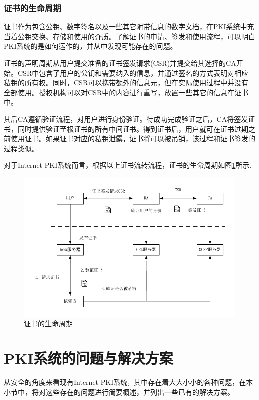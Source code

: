 \subsubsection{证书的生命周期}


证书作为包含公钥、数字签名以及一些其它附带信息的数字文档，在PKI系统中充当着公钥交换、存储和使用的介质。了解证书的申请、签发和使用流程，可以明白PKI系统的是如何运作的，并从中发现可能存在的问题。

证书的声明周期从用户提交准备的证书签发请求(CSR)并提交给其选择的CA开始。CSR中包含了用户的公钥和需要纳入的信息，并通过签名的方式表明对相应私钥的所有权。同时，CSR可以携带额外的信息元，但在实际使用过程中并没有全部使用。授权机构可以对CSR中的内容进行重写，放置一些其它的信息在证书中。

其后CA遵循验证流程，对用户进行身份验证。待成功完成验证之后，CA将签发证书，同时提供验证至根证书的所有中间证书。得到证书后，用户就可在证书过期之前使用证书。如果证书对应的私钥泄露，证书将可以被吊销，该过程和证书签发的过程类似。

对于Internet PKI系统而言，根据以上证书流转流程，证书的生命周期如图\ref{fig:cert_lifecycle}所示.

\begin{figure}[htbp]
 	\centering
 	\includegraphics[width = 1\textwidth]{img/cert_lifecycle}
 	\caption{证书的生命周期}\label{fig:cert_lifecycle}
\end{figure}

\section{PKI系统的问题与解决方案}

从安全的角度来看现有Internet PKI系统，其中存在着大大小小的各种问题，在本小节中，将对这些存在的问题进行简要概述，并列出一些已有的解决方案。

